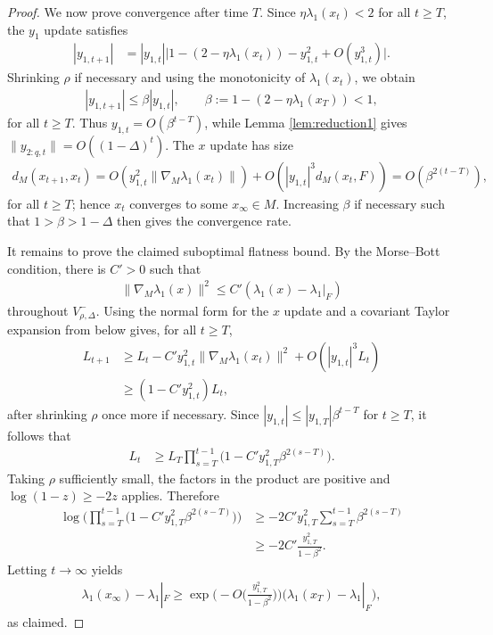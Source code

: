 \documentclass{article}
\theoremstyle{plain}
\theoremstyle{definition}
\theoremstyle{remark}
\begin{document}
\begin{proof}
    We now prove convergence after time $T$. Since $\eta\lambda_1(x_t)<2$ for all $t\geq T$, the $y_1$ update satisfies
    \begin{align}
        |y_{1,t+1}|
        &= |y_{1,t}|\big|1-(2-\eta\lambda_1(x_t))-y_{1,t}^2+O(y_{1,t}^3)\big|.
    \end{align}
    Shrinking $\rho$ if necessary and using the monotonicity of $\lambda_1(x_t)$, we obtain
    \begin{align}
        |y_{1,t+1}|\leq \beta |y_{1,t}|,
        \qquad 
        \beta:=1-(2-\eta\lambda_1(x_T))<1,
    \end{align}
    for all $t\geq T$. Thus $y_{1,t}=O(\beta^{t-T})$, while Lemma \ref{lem:reduction1} gives $\|y_{2:q,t}\|=O((1-\Delta)^t)$. The $x$ update has size
    \begin{align}
        d_M(x_{t+1},x_t)
        =O(y_{1,t}^2\|\nabla_M\lambda_1(x_t)\|)
        +O(|y_{1,t}|^3d_M(x_t,F)) = O(\beta^{2(t-T)}),
    \end{align}
    for all $t\geq T$; hence $x_t$ converges to some $x_{\infty}\in M$. Increasing $\beta$ if necessary such that $1>\beta>1-\Delta$ then gives the convergence rate.

    It remains to prove the claimed suboptimal flatness bound. By the Morse--Bott condition, there is $C'>0$ such that
    \begin{align}
        \|\nabla_M\lambda_1(x)\|^2\leq C'(\lambda_1(x)-\lambda_1|_F)
    \end{align}
    throughout $V^-_{\rho,\Delta}$. Using the normal form for the $x$ update and a covariant Taylor expansion from below gives, for all $t\geq T$,
    \begin{align}
        L_{t+1}
        &\geq L_t-C'y_{1,t}^2\|\nabla_M\lambda_1(x_t)\|^2+O(|y_{1,t}|^3L_t) \\
        &\geq (1-C'y_{1,t}^2)L_t,
    \end{align}
    after shrinking $\rho$ once more if necessary. Since $|y_{1,t}|\leq |y_{1,T}|\beta^{t-T}$ for $t\geq T$, it follows that
    \begin{align}
        L_t
        &\geq L_T\prod_{s=T}^{t-1}\big(1-C'y_{1,T}^2\beta^{2(s-T)}\big).
    \end{align}
    Taking $\rho$ sufficiently small, the factors in the product are positive and $\log(1-z)\geq -2z$ applies. Therefore
    \begin{align}
        \log\bigg(\prod_{s=T}^{t-1}\big(1-C'y_{1,T}^2\beta^{2(s-T)}\big)\bigg)
        &\geq -2C' y_{1,T}^2\sum_{s=T}^{t-1}\beta^{2(s-T)} \\
        &\geq -2C'\frac{y_{1,T}^2}{1-\beta^2}.
    \end{align}
    Letting $t\rightarrow\infty$ yields
    \begin{align}
        \lambda_1(x_{\infty})-\lambda_1|_F
        \geq 
        \exp\bigg(-O\bigg(\frac{y_{1,T}^2}{1-\beta^2}\bigg)\bigg)
        \big(\lambda_1(x_T)-\lambda_1|_F\big),
    \end{align}
    as claimed.
\end{proof}
\end{document}
